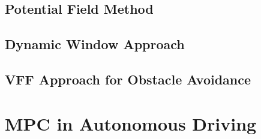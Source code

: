 \subsection{Potential Field Method}
\subsection{Dynamic Window Approach}
\subsection{VFF Approach for Obstacle Avoidance}
\section{MPC in Autonomous Driving}
\cite{4651075}
\cite{vsantos2010}
\cite{borelli}
\cite{Skoda:Thesis:2016}